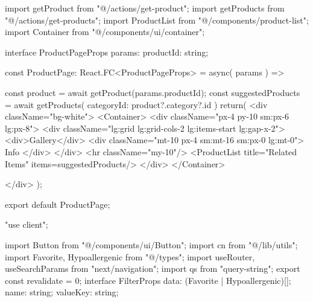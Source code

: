 
import getProduct from "@/actions/get-product";
import getProducts from "@/actions/get-products";
import ProductList from "@/components/product-list";
import Container from "@/components/ui/container";

interface ProductPageProps{
    params: {
        productId: string;
    }
}

const ProductPage: React.FC<ProductPageProps> = async({
    params
}) => {
    const product = await getProduct(params.productId);
    const suggestedProducts = await getProducts({
            categoryId: product?.category?.id
    })
    return(
        <div className="bg-white">
            <Container>
                <div className="px-4 py-10 sm:px-6 lg:px-8">
                    <div className="lg:grid lg:grid-cols-2 lg:items-start lg:gap-x-2">
                        <div>Gallery</div>
                        <div className="mt-10 px-4 sm:mt-16 sm:px-0 lg:mt-0">
                            Info
                        </div>
                    </div>
                    <hr className="my-10"/>
                    <ProductList title="Related Items" items={suggestedProducts}/>
                </div>
            </Container>
            
        </div>
    );
}


export default ProductPage;




"use client";

import Button from "@/components/ui/Button";
import { cn } from "@/lib/utils";
import { Favorite, Hypoallergenic } from "@/types";
import { useRouter, useSearchParams } from "next/navigation";
import qs from "query-string";
export const revalidate = 0;
interface FilterProps {
    data: (Favorite | Hypoallergenic)[];
    name: string;
    valueKey: string;
}

